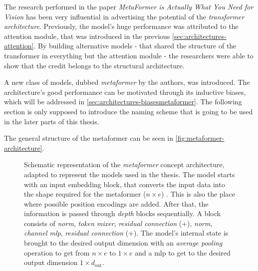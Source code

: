 The research performed in the paper \emph{MetaFormer is Actually What You Need for Vision} \cite{metaformerPaper} has been very influential in advertising the potential of the \emph{transformer architecture}.
Previously, the model's huge performance was attributed to the attention module, that was introduced in the previous \autoref{sec:architectures-attention}. 
By building alternative models - that shared the structure of the transformer in everything but the attention module - the researchers were able to show that the credit belongs to the structural architecture.

A new class of models, dubbed \emph{metaformer} by the authors, was introduced. 
The architecture's good performance can be motivated through its inductive biases, which will be addressed in \autoref{sec:architectures-biasesmetaformer}.
The following section is only supposed to introduce the naming scheme that is going to be used in the later parts of this thesis.

The general structure of the metaformer can be seen in \autoref{fig:metaformer-architecture}.

\begin{figure}[htbp]
    \centering
    \caption{Schematic representation of the \emph{metaformer} concept architecture, adapted to represent the models used in the thesis. 
    The model starts with an input embedding block, that converts the input data into the shape required for the metaformer ($n\times e$) \cite{imageWorth16x16}. This is also the place where possible position encodings are added. 
    After that, the information is passed through \emph{depth} blocks sequentially. 
    A block consists of \emph{norm}, \emph{token mixer}, \emph{residual connection} (+), 
    \emph{norm}, \emph{channel mlp}, \emph{residual connection} (+).
    The model's internal state is brought to the desired output dimension with an \emph{average pooling} operation to get from $n \times e$ to $1 \times e$ and a mlp to get to the desired output dimension $1 \times d_\mathrm{out}$.
    }
    \label{fig:metaformer-architecture}
\end{figure}

